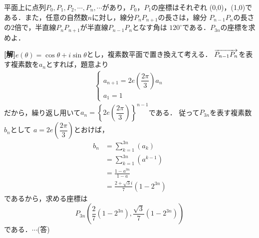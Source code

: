 \documentclass[a4j]{jarticle}
\begin{document}

     \begin{oframed}
     平面上に点列$P_0,P_1,P_2,\cdots,P_n,\cdots$があり，$P_0$，$P_1$の座標はそれぞれ
     (0,0)，(1,0)である．また，任意の自然数$n$に対し，線分$P_nP_{n+1}$の長さは，線分
     $P_{n-1}P_n$の長さの$2$倍で，半直線$P_nP_{n+1}$が半直線$P_{n-1}P_n$となす角は
     $120^\circ$である．$P_{3n}$の座標を求めよ．
     \end{oframed}

\setlength{\columnseprule}{0.4pt}
\begin{multicols}{2}
{\bf[解]}$e(\theta)=\cos\theta+i\sin\theta$とし，複素数平面で置き換えて考える．
$\overrightarrow{P_{n-1}P_n}$を表す複素数を$a_n$とすれば，題意より
     \begin{align*}
     \left\{
          \begin{array}{l}
          a_{n+1}=2e\left(\dfrac{2\pi}{3}\right)a_n  \\
          a_1=1
          \end{array}
     \right.
     \end{align*}
だから，繰り返し用いて$a_n=\left\{2e\left(\dfrac{2\pi}{3}\right)\right\}^{n-1}$である．
従って$P_{3n}$を表す複素数$b_{n}$として
$a=2e\left(\dfrac{2\pi}{3}\right)$とおけば，
     \begin{align*}
     b_n&=\sum_{k=1}^{3n}(a_k) \\
     &=\sum_{k=1}^{3n}(a^{k-1}) \\
     &=\frac{1-a^{3n}}{1-a} \\
     &=\frac{2+\sqrt{3}i}{7}(1-2^{3n}) 
     \end{align*}
であるから，求める座標は
      \[P_{3n}\left(\dfrac{2}{7}(1-2^{3n}),\dfrac{\sqrt{3}}{7}(1-2^{3n})\right)\]
である．$\cdots$(答)
\newpage
\end{multicols}
\end{document}
